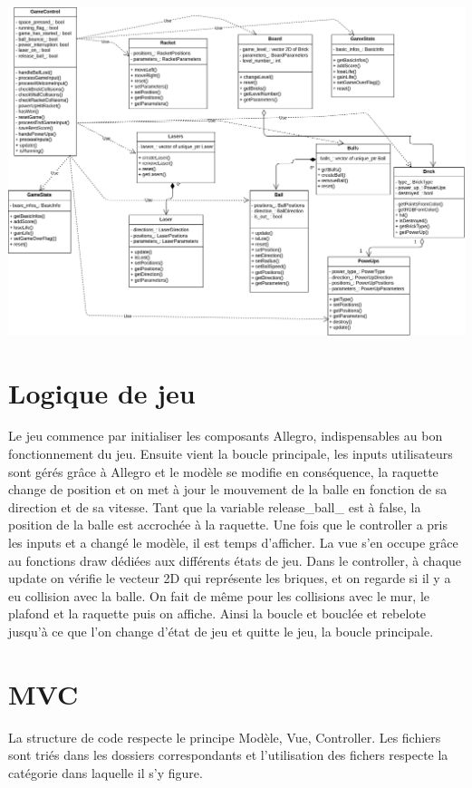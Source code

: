 \documentclass{article}
\begin{document}
\includegraphics[width=\textwidth]{controller.png}


\section{Logique de jeu}

Le jeu commence par initialiser les composants Allegro, indispensables au bon fonctionnement du jeu. Ensuite vient la boucle principale, les inputs utilisateurs sont gérés grâce à Allegro 
et le modèle se modifie en conséquence, la raquette change de position et on met à jour le mouvement de la balle en fonction de sa direction et de sa vitesse. Tant que la variable release\_ball\_ 
est à false, la position de la balle est accrochée à la raquette. Une fois que le controller a pris les inputs et a changé le modèle, il est temps d'afficher. La vue s'en occupe grâce au fonctions
draw dédiées aux différents états de jeu. Dans le controller, à chaque update on vérifie le vecteur 2D qui représente les briques, et on regarde si il y a eu collision avec la balle. On fait de même 
pour les collisions avec le mur, le plafond et la raquette puis on affiche. Ainsi la boucle et bouclée et rebelote jusqu'à ce que l'on change d'état de jeu et quitte le jeu, la boucle principale.

\section{MVC}

La structure de code respecte le principe Modèle, Vue, Controller. Les fichiers sont triés dans les dossiers correspondants et l'utilisation des fichers respecte la catégorie dans laquelle il s'y figure.
\end{document}
